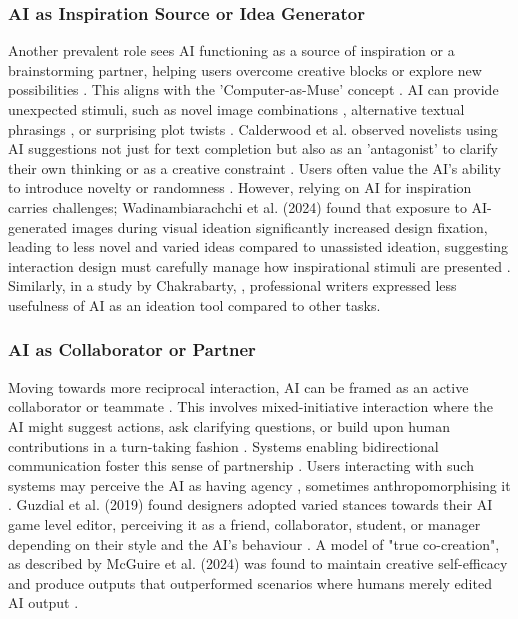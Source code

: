 \subsubsection{AI as Inspiration Source or Idea Generator}
Another prevalent role sees AI functioning as a source of inspiration or a brainstorming partner, helping users overcome creative blocks or explore new possibilities \cite{Calderwood2020-gg, Wan2023-he}. This aligns with the 'Computer-as-Muse' concept \cite{Lubart2005-zi}. AI can provide unexpected stimuli, such as novel image combinations \cite{Haase2024-yp, Kim2023-zq}, alternative textual phrasings \cite{Clark2018-yf, Doshi2023-dv}, or surprising plot twists \cite{Yang2022-vs, Ghajargar2022-af}. Calderwood et al. observed novelists using AI suggestions not just for text completion but also as an 'antagonist' to clarify their own thinking or as a creative constraint \cite{Calderwood2020-gg}. Users often value the AI's ability to introduce novelty or randomness \cite{Yang2022-vs, Bougueng-Tchemeube2023-nm}. However, relying on AI for inspiration carries challenges; Wadinambiarachchi et al. (2024) found that exposure to AI-generated images during visual ideation significantly increased design fixation, leading to less novel and varied ideas compared to unassisted ideation, suggesting interaction design must carefully manage how inspirational stimuli are presented \cite{Wadinambiarachchi2024-jn}. Similarly, in a study by Chakrabarty, \cite{Chakrabarty2024-ov}, professional writers expressed less usefulness of AI as an ideation tool compared to other tasks.

\subsubsection{AI as Collaborator or Partner}
Moving towards more reciprocal interaction, AI can be framed as an active collaborator or teammate \cite{Lin2023-jd, Guzdial2019-cv}. This involves mixed-initiative interaction where the AI might suggest actions, ask clarifying questions, or build upon human contributions in a turn-taking fashion \cite{Lin2023-zq, Zhou2024-vp, Davis2016-te}. Systems enabling bidirectional communication foster this sense of partnership \cite{Rezwana2023-gj}. Users interacting with such systems may perceive the AI as having agency \cite{Lawton2023-tb, Yang2022-vs}, sometimes anthropomorphising it \cite{Oh2018-mu, Ghajargar2022-af}. Guzdial et al. (2019) found designers adopted varied stances towards their AI game level editor, perceiving it as a friend, collaborator, student, or manager depending on their style and the AI's behaviour \cite{Guzdial2019-gr}. A model of "true co-creation", as described by McGuire et al. (2024) was found to maintain creative self-efficacy and produce outputs that outperformed scenarios where humans merely edited AI output \cite{McGuire2024-im}.

